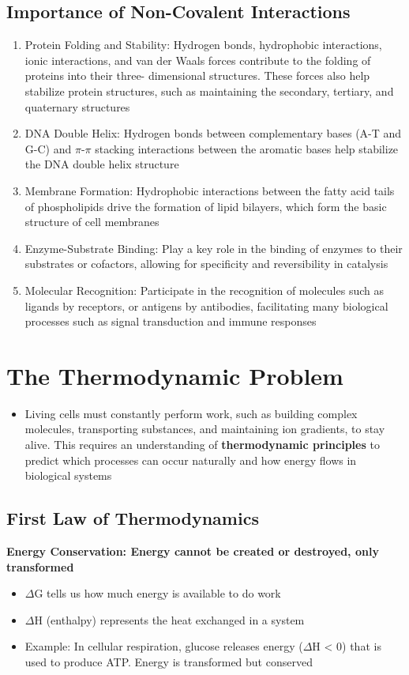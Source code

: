 \documentclass[10pt]{article}
\begin{document}
\subsection*{Importance of Non-Covalent Interactions}
\begin{enumerate}
    \item Protein Folding and Stability: Hydrogen bonds, hydrophobic interactions, ionic interactions, and van der Waals forces contribute to the folding of proteins into their three- dimensional structures. These forces also help stabilize protein structures, such as maintaining the secondary, tertiary, and quaternary structures
    \item DNA Double Helix: Hydrogen bonds between complementary bases (A-T and G-C) and $\pi$-$\pi$ stacking interactions between the aromatic bases help stabilize the DNA double helix structure
    \item Membrane Formation: Hydrophobic interactions between the fatty acid tails of phospholipids drive the formation of lipid bilayers, which form the basic structure of cell membranes
    \item Enzyme-Substrate Binding: Play a key role in the binding of enzymes to their substrates or cofactors, allowing for specificity and reversibility in catalysis
    \item Molecular Recognition: Participate in the recognition of molecules such as ligands by receptors, or antigens by antibodies, facilitating many biological processes such as signal transduction and immune responses
\end{enumerate}

\section*{The Thermodynamic Problem}
\begin{itemize}
    \item Living cells must constantly perform work, such as building complex molecules, transporting substances, and maintaining ion gradients, to stay alive. This requires an understanding of \textbf{thermodynamic principles} to predict which processes can occur naturally and how energy flows in biological systems
\end{itemize}
\subsection*{First Law of Thermodynamics}
\textbf{Energy Conservation: Energy cannot be created or destroyed, only transformed}
\begin{itemize}
    \item $\Delta$G tells us how much energy is available to do work
    \item $\Delta$H (enthalpy) represents the heat exchanged in a system
    \item Example: In cellular respiration, glucose releases energy ($\Delta$H < 0) that is used to produce ATP. Energy is transformed but conserved
\end{itemize}
\end{document}
